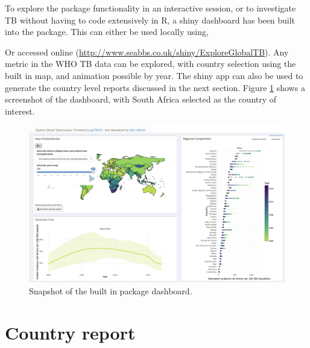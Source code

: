 \documentclass[11pt,twoside]{bristolthesis}
\begin{document}
  To explore the package functionality in an interactive session, or to investigate TB without having to code extensively in R, a shiny dashboard has been built into the package. This can either be used locally using,
  \begin{Shaded}
  \begin{Highlighting}[]
  \NormalTok{()}
  \end{Highlighting}
  \end{Shaded}
  Or accessed online (\url{http://www.seabbs.co.uk/shiny/ExploreGlobalTB}). Any metric in the WHO TB data can be explored, with country selection using the built in map, and animation possible by year. The shiny app can also be used to generate the country level reports discussed in the next section. Figure \ref{fig:dash-snapshot} shows a screenshot of the dashboard, with South Africa selected as the country of interest.
  \begin{figure}
  
  {\centering \includegraphics[width=0.8\linewidth]{chapters/getTBinR/img/ExploreGlobalTB} 
  
  }
  
  \caption{Snapshot of the built in package dashboard.}\label{fig:dash-snapshot}
  \end{figure}
  \hypertarget{country-report}{%
  \section{Country report}\label{country-report}}
  
\end{document}
